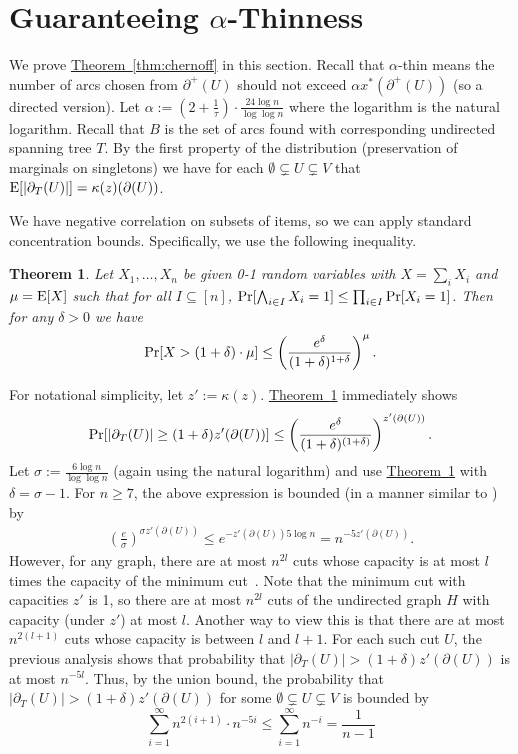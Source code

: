 \documentclass[11pt]{article}
\newcommand{\lref}[2][]{\hyperref[#2]{#1~\ref*{#2}}}
\newtheorem{theorem}{Theorem}[section]
\theoremstyle{definition}
\def\A{{B}}
\def\E{{\rm E}}
\def\Pr{{\rm Pr}}
\begin{document}
\section{Guaranteeing $\alpha$-Thinness}
\label{sec:chernoff}
We prove \lref[Theorem]{thm:chernoff} in this section.  Recall that
$\alpha$-thin means the number of arcs chosen from $\partial^+(U)$
should not exceed $\alpha x^*(\partial^+(U))$ (so a directed version).
Let $\alpha := \left(2+\frac{1}{\tau}\right)\cdot\frac{24 \log
  n}{\log\log n}$ where the logarithm is the natural logarithm. Recall
that $\A$ is the set of arcs found with corresponding undirected
spanning tree $T$.  By the first property of the distribution
(preservation of marginals on singletons) we have for each $\emptyset
\subsetneq U \subsetneq V$ that $\E[|\partial_T(U)|] =
\kappa(z)(\partial(U))$.

We have negative correlation on subsets of items, so we can apply standard concentration bounds.
Specifically, we use the following inequality.
\begin{theorem}{\cite[Theorem 3.4]{PS97}}\label{thm:ps}
Let $X_1, \ldots, X_n$ be given 0-1 random variables with $X = \sum_i X_i$ and $\mu = \E[X]$ such that for all $I \subseteq [n]$,
$\Pr[\bigwedge_{i \in I} X_i = 1] \leq \prod_{i \in I} \Pr[X_i = 1]$. Then for any $\delta > 0$ we have
\[ \Pr[X > (1 + \delta) \cdot \mu] \leq \left(\frac{e^\delta}{(1 + \delta)^{1+\delta}}\right)^{\mu}. \]
\end{theorem}

For notational simplicity, let $z' := \kappa(z)$.
\lref[Theorem]{thm:ps} immediately shows
\[ \Pr[|\partial_T(U)| \geq (1+\delta) z'(\partial(U))] \leq \left(\frac{e^\delta}{(1+\delta)^{(1+\delta)}}\right)^{z'(\partial(U))}.\]
Let $\sigma := \frac{6 \log n}{\log\log n}$ (again using the natural logarithm) and use \lref[Theorem]{thm:ps} with $\delta = \sigma-1$.
For $n \geq 7$, the above expression is bounded (in a manner similar to \cite{AGMSS}) by
\begin{eqnarray*}
\left(\frac{e}{\sigma}\right)^{\sigma z'(\partial(U))} \leq e^{-z'(\partial(U)) 5 \log n} = n^{-5 z'(\partial(U))}.
\end{eqnarray*}
However, for any graph, there are at most $n^{2l}$ cuts whose capacity
is at most $l$ times the capacity of the minimum
cut~\cite{KS96}. Note that the minimum cut with capacities $z'$ is 1, so
there are at most $n^{2l}$ cuts of the undirected graph $H$ with capacity (under $z'$) at most $l$.
Another way to view this is that there are at most $n^{2(l+1)}$ cuts whose capacity is between $l$ and $l+1$.
For each such cut $U$, the previous analysis shows that
probability that $|\partial_T(U)| > (1+\delta)z'(\partial(U))$ is at most $n^{-5l}$.
Thus, by the union bound, the probability that $|\partial_T(U)| > (1+\delta)z'(\partial(U))$
for some $\emptyset \subsetneq U \subsetneq V$ is bounded by
\[
\sum_{i=1}^\infty n^{2(i+1)}\cdot n^{-5i} \leq \sum_{i=1}^\infty n^{-i} = \frac{1}{n-1}
\]
\end{document}
